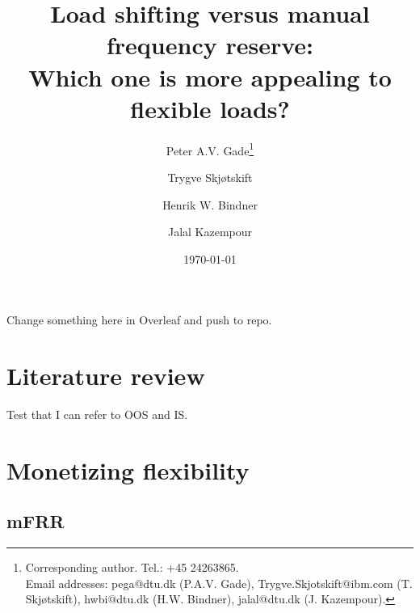 \documentclass[11pt,a4paper]{article}
\begin{document}
\title{
    Load shifting versus manual frequency reserve: \\ Which one is more appealing to flexible loads?
}
\author[1,2]{Peter A.V. Gade\footnote{Corresponding author. Tel.: +45 24263865. \\ Email addresses: pega@dtu.dk (P.A.V. Gade), Trygve.Skjotskift@ibm.com (T. Skjøtskift), hwbi@dtu.dk (H.W. Bindner), jalal@dtu.dk (J. Kazempour).}}
\author[2]{Trygve Skjøtskift}
\author[1]{Henrik W. Bindner}
\author[1]{Jalal Kazempour}
\renewcommand\Affilfont{\itshape\small}

\date{\today}
{\let\newpage\relax\maketitle}

\tableofcontents

\newpage

\printnoidxglossary[type=type1, nonumberlist]
\printnoidxglossary[type=type2, nonumberlist]
\glsenablehyper




Change something here in Overleaf and push to repo.



\section{Literature review}

Test that I can refer to \gls{OOS} and \gls{IS}.

\section{Monetizing flexibility}

\subsection{mFRR}
\end{document}
